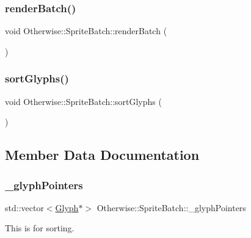 \subsubsection{\texorpdfstring{render\+Batch()}{renderBatch()}}
{\footnotesize\ttfamily void Otherwise\+::\+Sprite\+Batch\+::render\+Batch (\begin{DoxyParamCaption}{ }\end{DoxyParamCaption})}

\mbox{\label{class_otherwise_1_1_sprite_batch_a9558cb9c9930c2280c51371268ee8db1}} 
\subsubsection{\texorpdfstring{sort\+Glyphs()}{sortGlyphs()}}
{\footnotesize\ttfamily void Otherwise\+::\+Sprite\+Batch\+::sort\+Glyphs (\begin{DoxyParamCaption}{ }\end{DoxyParamCaption})\hspace{0.3cm}{\ttfamily [private]}}



\subsection{Member Data Documentation}
\mbox{\label{class_otherwise_1_1_sprite_batch_aaf7d70e727f9d649d94ae50001096804}} 
\subsubsection{\texorpdfstring{\+\_\+glyph\+Pointers}{\_glyphPointers}}
{\footnotesize\ttfamily std\+::vector$<$\hyperlink{class_otherwise_1_1_glyph}{Glyph}$\ast$$>$ Otherwise\+::\+Sprite\+Batch\+::\+\_\+glyph\+Pointers\hspace{0.3cm}{\ttfamily [private]}}



This is for sorting. 

